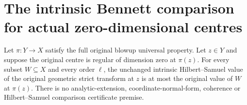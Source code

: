 \section{The intrinsic Bennett comparison for actual zero-dimensional centres}

\begin{theorem}
\label{hir:actual-manifold-point-centre-bennett-all-orders}
Let $\pi:Y\to X$ satisfy the full original blowup universal property.
Let $z\in Y$ and suppose the original centre is regular of dimension
zero at $\pi(z)$. For every subset $W\subseteq X$ and every order $\ell$,
the unchanged intrinsic Hilbert--Samuel value of the original geometric
strict transform at $z$ is at most the original value of $W$ at $\pi(z)$.
\leanok
There is no analytic-extension, coordinate-normal-form, coherence or
Hilbert--Samuel comparison certificate premise.
\end{theorem}
